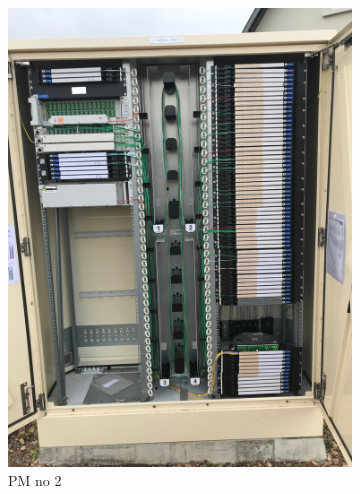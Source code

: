 \begin{figure}[H]
\begin{subfigure}{0.3\textwidth}
        \includegraphics[width=\linewidth]{images/pm_example_2.jpg}
        \caption{PM no 2}
    \end{subfigure}
    \begin{subfigure}{0.3\textwidth}

\end{subfigure}
\end{figure}

